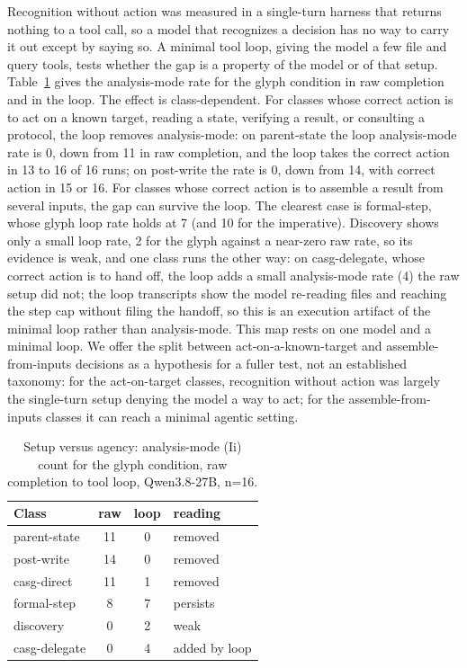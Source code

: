 \documentclass[11pt,a4paper]{article}
\begin{document}
Recognition without action was measured in a single-turn harness that returns nothing to
a tool call, so a model that recognizes a decision has no way to carry it out except by
saying so. A minimal tool loop, giving the model a few file and query tools, tests
whether the gap is a property of the model or of that setup. Table~\ref{tab:loop} gives
the analysis-mode rate for the glyph condition in raw completion and in the loop. The
effect is class-dependent. For classes whose correct action is to act on a known target,
reading a state, verifying a result, or consulting a protocol, the loop removes
analysis-mode: on parent-state the loop analysis-mode rate is 0, down from 11 in raw
completion, and the loop takes the correct action in 13 to 16 of 16 runs; on post-write
the rate is 0, down from 14, with correct action in 15 or 16. For classes whose correct
action is to assemble a result from several inputs, the gap can survive the loop. The
clearest case is formal-step, whose glyph loop rate holds at 7 (and 10 for the
imperative). Discovery shows only a small loop rate, 2 for the glyph against a near-zero
raw rate, so its evidence is weak, and one class runs the other way: on casg-delegate,
whose correct action is to hand off, the loop adds a small analysis-mode rate (4) the raw
setup did not; the loop transcripts show the model re-reading files and reaching the step
cap without filing the handoff, so this is an execution artifact of the minimal loop
rather than analysis-mode. This map rests on one model and a minimal loop. We offer the
split between act-on-a-known-target and assemble-from-inputs decisions as a hypothesis for
a fuller test, not an established taxonomy: for the act-on-target classes, recognition
without action was largely the single-turn setup denying the model a way to act; for the
assemble-from-inputs classes it can reach a minimal agentic setting.

\begin{table}[h]
\centering
\small
\caption{Setup versus agency: analysis-mode (Ii) count for the glyph condition, raw
  completion to tool loop, Qwen3.8-27B, n=16.}
\label{tab:loop}
\begin{tabular}{@{}lccl@{}}
\toprule
Class & raw & loop & reading \\
\midrule
parent-state & 11 & 0 & removed \\
post-write   & 14 & 0 & removed \\
casg-direct  & 11 & 1 & removed \\
formal-step  & 8  & 7 & persists \\
discovery    & 0  & 2 & weak \\
casg-delegate & 0 & 4 & added by loop \\
\bottomrule
\end{tabular}
\end{table}
\end{document}
